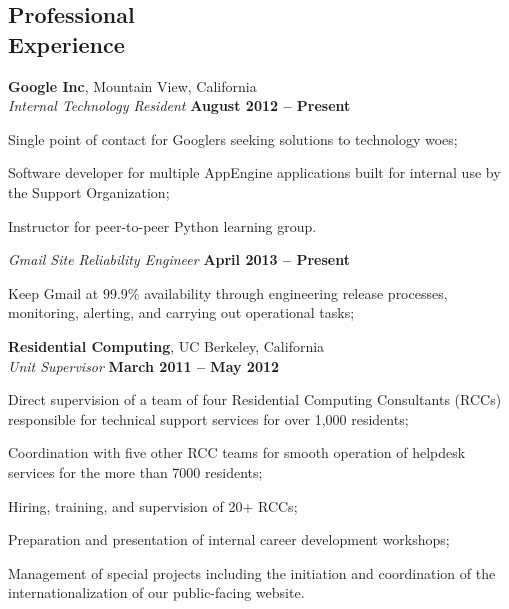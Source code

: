 \documentclass[margin,line]{resume}
\begin{document}
\begin{resume}
	\section{\mysidestyle Professional\\Experience}

	\textbf{Google Inc}, Mountain View, California \vspace{1mm}\\\vspace{0mm}%
	\textsl{Internal Technology Resident} \hfill \textbf{August 2012 -- Present}
	\begin{list2}
		\item Single point of contact for Googlers seeking solutions to technology woes;
		\item Software developer for multiple AppEngine applications built for internal use by the Support Organization;
		\item Instructor for peer-to-peer Python learning group.
	\end{list2}\vspace{-1.5mm}

	\textsl{Gmail Site Reliability Engineer} \hfill \textbf{April 2013 -- Present}
	\begin{list2}
		\item Keep Gmail at 99.9\% availability through engineering release processes, monitoring, alerting, and carrying out operational tasks;

	\textbf{Residential Computing}, UC Berkeley, California \vspace{1mm}\\\vspace{0mm}%
	\textsl{Unit Supervisor} \hfill \textbf{March 2011 -- May 2012}
	\begin{list2}
		\item Direct supervision of a team of four Residential Computing Consultants (RCCs) responsible for technical support services for over 1,000 residents;
		\item Coordination with five other RCC teams for smooth operation of helpdesk services for the more than 7000 residents;
		\item Hiring, training, and supervision of 20+ RCCs;
		\item Preparation and presentation of internal career development workshops;
		\item Management of special projects including the initiation and coordination of the internationalization of our public-facing website.
	\end{list2}\vspace{-1.5mm}
	

\end{list2}
\end{resume}
\end{document}
